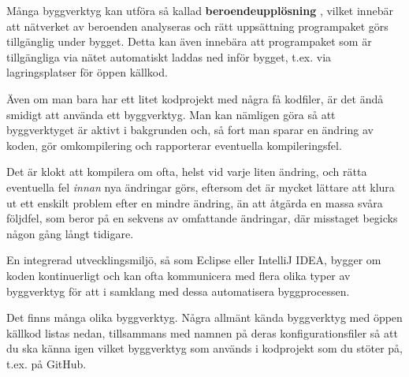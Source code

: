 Många byggverktyg kan utföra så kallad \textbf{beroendeupplösning} , vilket innebär att nätverket av beroenden analyseras och rätt uppsättning programpaket görs tillgänglig under bygget. Detta kan även innebära att programpaket som är tillgängliga via nätet automatiskt laddas ned inför bygget, t.ex. via lagringsplatser för öppen källkod.   

Även om man bara har ett litet kodprojekt med några få kodfiler, är det ändå smidigt att använda ett byggverktyg. Man kan nämligen göra så att byggverktyget är aktivt i bakgrunden och, så fort man sparar en ändring av koden, gör omkompilering och rapporterar eventuella kompileringsfel.

Det är klokt att kompilera om ofta, helst vid varje liten ändring, och rätta eventuella fel \textit{innan} nya ändringar görs, eftersom det är mycket lättare att klura ut ett enskilt problem efter en mindre ändring, än att åtgärda en massa svåra följdfel, som beror på en sekvens av omfattande ändringar, där misstaget begicks någon gång långt tidigare. 

En integrerad utvecklingsmiljö, så som Eclipse eller IntelliJ IDEA, bygger om koden kontinuerligt och kan ofta kommunicera med flera olika typer av byggverktyg för att i samklang med dessa automatisera byggprocessen.

Det finns många olika byggverktyg. Några allmänt kända byggverktyg med öppen källkod listas nedan, tillsammans med namnen på deras konfigurationsfiler så att du ska känna igen vilket byggverktyg som används i  kodprojekt som du stöter på, t.ex. på GitHub.

